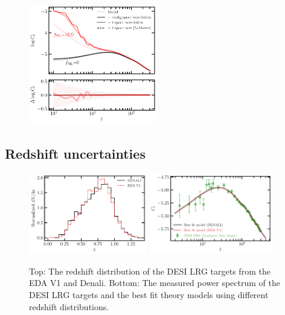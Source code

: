 \begin{figure}
    \centering
    \includegraphics[width=0.5\textwidth]{figures/cl_conv.pdf}
    \caption{}
    \label{fig:window_conv}
\end{figure}

\subsection{Redshift uncertainties}\label{ssec:nzuncer}

\begin{figure}
\raggedleft
\includegraphics[width=0.46\textwidth]{figures/nz_lrg_eda.pdf}
\includegraphics[width=0.48\textwidth]{figures/cl_nz.pdf}\caption{Top: The redshift distribution of the DESI LRG targets from the EDA V1 and Denali. Bottom: The measured power spectrum of the DESI LRG targets and the best fit theory models using different redshift distributions.}\label{fig:cl_nz}
\end{figure}

